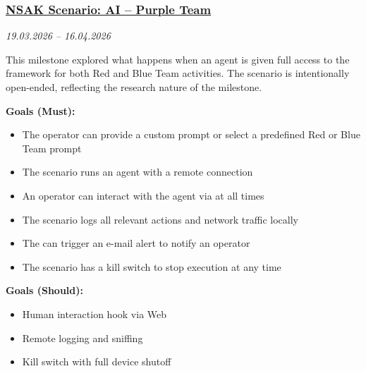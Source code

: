 \subsubsection{\href{https://gitlab.ti.bfh.ch/groups/gausf1-vonal3/-/milestones/18}{NSAK Scenario: AI -- Purple Team}}\label{subsubsec:milestone-ai-purple-team}
\textit{19.03.2026 -- 16.04.2026}

This milestone explored what happens when an  agent is given full access to the  framework for both Red and Blue Team activities.
The scenario is intentionally open-ended, reflecting the research nature of the milestone.

\textbf{Goals (Must):}
\begin{itemize}
    \item[$\square$] The operator can provide a custom prompt or select a predefined Red or Blue Team prompt
    \item[$\square$] The scenario runs an  agent with a remote connection
    \item[$\square$] An operator can interact with the agent via  at all times
    \item[$\square$] The scenario logs all relevant actions and network traffic locally
    \item[$\square$] The  can trigger an e-mail alert to notify an operator
    \item[$\square$] The scenario has a kill switch to stop execution at any time
\end{itemize}

\textbf{Goals (Should):}
\begin{itemize}
    \item[$\square$] Human interaction hook via Web 
    \item[$\square$] Remote logging and sniffing
    \item[$\square$] Kill switch with full device shutoff
\end{itemize}
